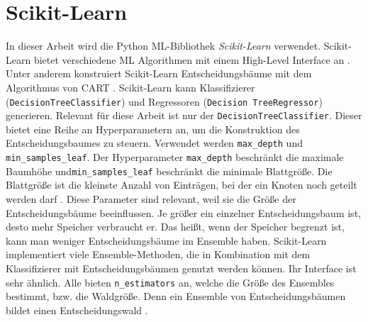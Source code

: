 \section{Scikit-Learn}
In dieser Arbeit wird die Python ML-Bibliothek \textit{Scikit-Learn} verwendet. Scikit-Learn bietet verschiedene ML Algorithmen mit einem High-Level Interface an \cite{scikit-learn}. Unter anderem konstruiert Scikit-Learn
Entscheidungsbäume mit dem Algorithmus von CART \cite{ScikitLearnCART}. Scikit-Learn kann Klassifizierer (\texttt{DecisionTreeClassifier}) und Regressoren (\texttt{Decision TreeRegressor}) generieren.
\newline
\newline
Relevant für diese Arbeit ist nur der \texttt{DecisionTreeClassifier}. Dieser bietet eine Reihe an Hyperparametern an, um die Konstruktion des Entscheidungsbaumes zu steuern. Verwendet werden \texttt{max\_depth}
und \texttt{min\_samples\_leaf}. Der Hyperparameter \texttt{max\_depth} beschränkt die maximale Baumhöhe und\texttt{min\_samples\_leaf} beschränkt die minimale Blattgröße.
Die Blattgröße ist die kleinste Anzahl von Einträgen, bei der ein Knoten noch geteilt werden darf \cite{ScikitLearnDTC}.
Diese Parameter sind relevant, weil sie die Größe der Entscheidungsbäume beeinflussen. Je größer ein einzelner Entscheidungsbaum ist, desto mehr Speicher
verbraucht er. Das heißt, wenn der Speicher begrenzt ist, kann man weniger Entscheidungsbäume im Ensemble haben.
\newline
\newline
Scikit-Learn implementiert viele Ensemble-Methoden, die in Kombination mit dem Klassifizierer mit Entscheidungsbäumen genutzt werden können. Ihr Interface ist sehr ähnlich.
Alle bieten \texttt{n\_estimators} an, welche die Größe des Ensembles bestimmt, bzw. die Waldgröße. Denn ein Ensemble von Entscheidungsbäumen bildet einen Entscheidungswald \cite{ScikitLearnEnsemble}.